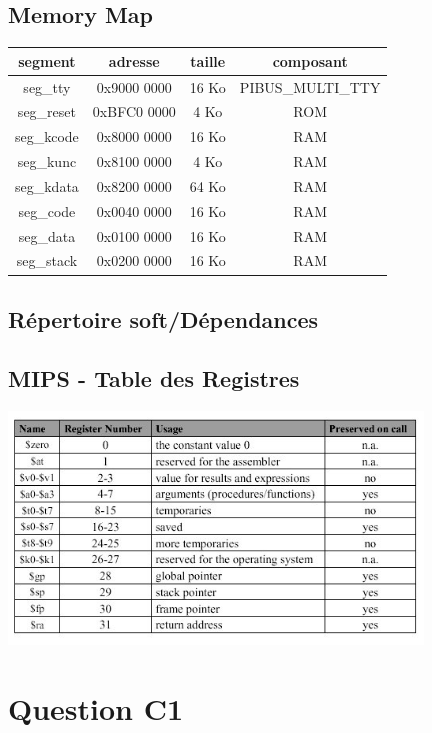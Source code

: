 \documentclass[10pt]{article}
\begin{document}
\subsection{Memory Map}
\begin{tabular}{|c|c|c|c|}
  \hline
  segment & adresse & taille & composant \\ \hline
  seg\_tty & 0x9000 0000 & 16 Ko & PIBUS\_MULTI\_TTY \\ \hline
  seg\_reset & 0xBFC0 0000 & 4 Ko & ROM \\ \hline
  seg\_kcode & 0x8000 0000 & 16 Ko & RAM \\ \hline
  seg\_kunc & 0x8100 0000 & 4 Ko & RAM \\ \hline
  seg\_kdata & 0x8200 0000 & 64 Ko & RAM \\ \hline
  seg\_code & 0x0040 0000 & 16 Ko & RAM \\ \hline
  seg\_data & 0x0100 0000 & 16 Ko & RAM \\ \hline
  seg\_stack & 0x0200 0000 & 16 Ko & RAM \\ \hline
\end{tabular}

\subsection{Répertoire soft/Dépendances}


\subsection{MIPS - Table des Registres}
\begin{center}
  \includegraphics[width=11cm]{mips-table.jpg}\\
\end{center}
\newpage

\section{Question C1}

\end{document}
